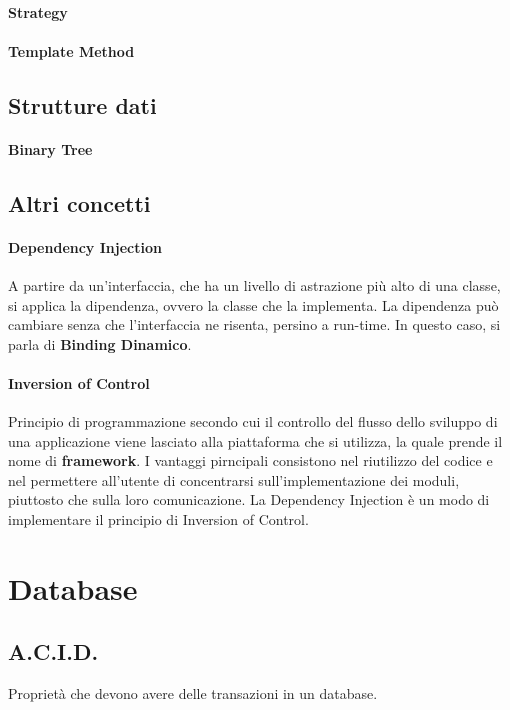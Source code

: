\documentclass{article}
\begin{document}
            \paragraph{Strategy}
            \paragraph{Template Method}
                
    \subsection{Strutture dati}
        \paragraph{Binary Tree}
    
    \subsection{Altri concetti}
        \paragraph{Dependency Injection} A partire da un'interfaccia, che ha un livello di astrazione più alto di una classe, si applica la dipendenza, ovvero la classe che la implementa. La dipendenza può cambiare senza che l'interfaccia ne risenta, persino a run-time. In questo caso, si parla di \textbf{Binding Dinamico}.
        \paragraph{Inversion of Control} Principio di programmazione secondo cui il controllo del flusso dello sviluppo di una applicazione viene lasciato alla piattaforma che si utilizza, la quale prende il nome di \textbf{framework}. I vantaggi pirncipali consistono nel riutilizzo del codice e nel permettere all'utente di concentrarsi sull'implementazione dei moduli, piuttosto che sulla loro comunicazione. La Dependency Injection è un modo di implementare il principio di Inversion of Control.

\section{Database}
    \subsection{A.C.I.D.}
        Proprietà che devono avere delle transazioni in un database.
\end{document}
